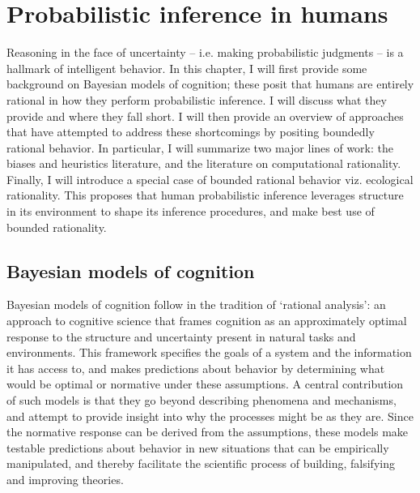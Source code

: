 

\chapter{Probabilistic inference in humans}
\label{chap:psych}

Reasoning in the face of uncertainty -- i.e. making probabilistic judgments -- is a hallmark of intelligent behavior. In this chapter, I will first provide some background on Bayesian models of cognition; these posit that humans are entirely rational in how they perform probabilistic inference. I will discuss what they provide and where they fall short. I will then provide an overview of approaches that have attempted to address these shortcomings by positing boundedly rational behavior. In particular, I will summarize two major lines of work: the biases and heuristics literature, and the literature on computational rationality. Finally, I will introduce a special case of bounded rational behavior viz. ecological rationality. This proposes that human probabilistic inference leverages structure in its environment to shape its inference procedures, and make best use of bounded rationality.

\section{Bayesian models of cognition}
Bayesian models of cognition follow in the tradition of `rational analysis'\cite{shepard1987toward, anderson1990adaptive}: an approach to cognitive science that frames cognition as an approximately optimal response to the structure and uncertainty present in natural tasks and environments. This framework specifies the goals of a system and the information it has access to, and makes predictions about behavior by determining what would be optimal or normative under these assumptions. A central contribution of such models is that they go beyond describing phenomena and mechanisms, and attempt to provide insight into why the processes might be as they are. Since the normative response can be derived from the assumptions, these models make testable predictions about behavior in new situations that can be empirically manipulated, and thereby facilitate the scientific process of building, falsifying and improving theories.

